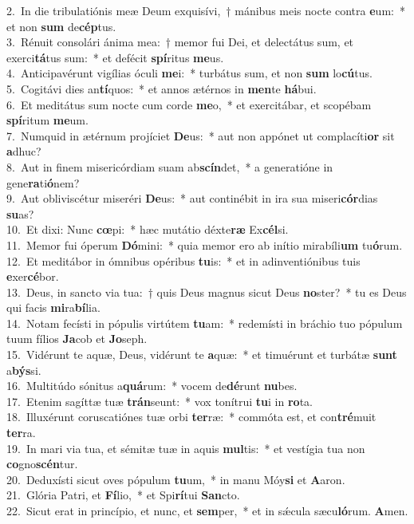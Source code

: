 {2.~}In die tribulatiónis meæ Deum exquisívi,~† mánibus meis nocte contra \textbf{e}um:~* et non \textbf{sum} de\textbf{cép}tus.\\
{3.~}Rénuit consolári ánima mea:~† memor fui Dei, et delectátus sum, et exerci\textbf{tá}tus sum:~* et defécit \textbf{spí}ritus \textbf{me}us.\\
{4.~}Anticipavérunt vigílias óculi \textbf{me}i:~* turbátus sum, et non \textbf{sum} lo\textbf{cú}tus.\\
{5.~}Cogitávi dies an\textbf{tí}quos:~* et annos ætérnos in \textbf{men}te \textbf{há}bui.\\
{6.~}Et meditátus sum nocte cum corde \textbf{me}o,~* et exercitábar, et scopébam \textbf{spí}ritum \textbf{me}um.\\
{7.~}Numquid in ætérnum projíciet \textbf{De}us:~* aut non appónet ut complacíti\textbf{or} sit \textbf{a}dhuc?\\
{8.~}Aut in finem misericórdiam suam ab\textbf{scín}det,~* a generatióne in gene\textbf{ra}ti\textbf{ó}nem?\\
{9.~}Aut obliviscétur miseréri \textbf{De}us:~* aut continébit in ira sua miseri\textbf{cór}dias \textbf{su}as?\\
{10.~}Et dixi: Nunc \textbf{cœ}pi:~* hæc mutátio déxte\textbf{ræ} Ex\textbf{cél}si.\\
{11.~}Memor fui óperum \textbf{Dó}mini:~* quia memor ero ab inítio mirabíli\textbf{um} tu\textbf{ó}rum.\\
{12.~}Et meditábor in ómnibus opéribus \textbf{tu}is:~* et in adinventiónibus tuis \textbf{e}xer\textbf{cé}bor.\\
{13.~}Deus, in sancto via tua:~† quis Deus magnus sicut Deus \textbf{no}ster?~* tu es Deus qui facis \textbf{mi}ra\textbf{bí}lia.\\
{14.~}Notam fecísti in pópulis virtútem \textbf{tu}am:~* redemísti in bráchio tuo pópulum tuum fílios \textbf{Ja}cob et \textbf{Jo}seph.\\
{15.~}Vidérunt te aquæ, Deus, vidérunt te \textbf{a}quæ:~* et timuérunt et turbátæ \textbf{sunt} a\textbf{býs}si.\\
{16.~}Multitúdo sónitus a\textbf{quá}rum:~* vocem de\textbf{dé}runt \textbf{nu}bes.\\
{17.~}Etenim sagíttæ tuæ \textbf{trán}seunt:~* vox tonítrui \textbf{tu}i in \textbf{ro}ta.\\
{18.~}Illuxérunt coruscatiónes tuæ orbi \textbf{ter}ræ:~* commóta est, et con\textbf{tré}muit \textbf{ter}ra.\\
{19.~}In mari via tua, et sémitæ tuæ in aquis \textbf{mul}tis:~* et vestígia tua non \textbf{co}gno\textbf{scén}tur.\\
{20.~}Deduxísti sicut oves pópulum \textbf{tu}um,~* in manu Móy\textbf{si} et \textbf{A}aron.\\
{21.~}Glória Patri, et \textbf{Fí}lio,~* et Spi\textbf{rí}tui \textbf{San}cto.\\
{22.~}Sicut erat in princípio, et nunc, et \textbf{sem}per,~* et in sǽcula sæcu\textbf{ló}rum. \textbf{A}men.\\
